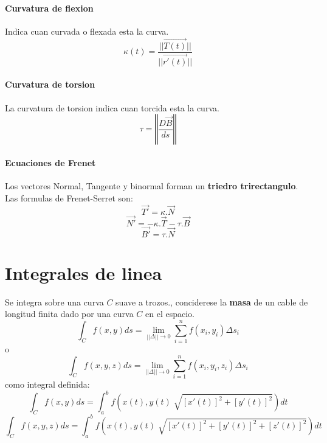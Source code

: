 \documentclass[11pt]{article}
\begin{document}
\paragraph{Curvatura de flexion}
Indica cuan curvada o flexada esta la curva.\\
\begin{equation*}
\kappa(t) = \dfrac{||\overrightarrow{T(t)}||}{||\overrightarrow{r'(t)}||}
\end{equation*}
\paragraph{Curvatura de torsion}
La curvatura de torsion indica cuan torcida esta la curva.
\begin{equation*}
	\tau = \left\Vert\dfrac{D\overrightarrow{B}}{ds} \right\Vert
\end{equation*}
\paragraph{Ecuaciones de Frenet}
Los vectores Normal, Tangente y binormal forman un \textbf{triedro trirectangulo}.\\
Las formulas de Frenet-Serret son:
\begin{equation*}
	\overrightarrow{T'} = \kappa.\overrightarrow{N}
\end{equation*}
\begin{equation*}
	\overrightarrow{N'} = -\kappa.\overrightarrow{T} - \tau.\overrightarrow{B}
\end{equation*}
\begin{equation*}
	\overrightarrow{B'} = \tau.\overrightarrow{N}
\end{equation*}
\section{Integrales de linea}
Se integra sobre una curva $C$ suave a trozos., conciderese la \textbf{masa} de un cable de longitud finita dado por una curva $C$ en el espacio.
\begin{equation*}
	\int_C f(x,y)ds = \lim_{||\Delta|| \rightarrow 0} \sum_{i=1}^n f(x_i, y_i)\Delta s_i
\end{equation*}
o
\begin{equation*}
	\int_C f(x,y,z)ds = \lim_{||\Delta|| \rightarrow 0} \sum_{i=1}^n f(x_i, y_i, z_i)\Delta s_i
\end{equation*}
como integral definida:
\begin{equation*}
	\int_C f(x,y)ds = \int_a^b f(x(t), y(t) \sqrt[]{[x'(t)]^2+[y'(t)]^2})dt
\end{equation*}
\begin{equation*}
	\int_C f(x,y,z)ds = \int_a^b f(x(t), y(t) \sqrt[]{[x'(t)]^2+[y'(t)]^2+ [z'(t)]^2})dt
\end{equation*}
\end{document}
